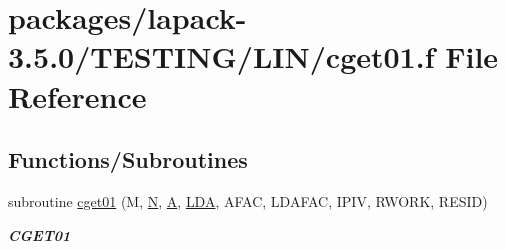 \hypertarget{cget01_8f}{}\section{packages/lapack-\/3.5.0/\+T\+E\+S\+T\+I\+N\+G/\+L\+I\+N/cget01.f File Reference}
\label{cget01_8f}
\subsection*{Functions/\+Subroutines}
\begin{DoxyCompactItemize}
\item 
subroutine \hyperlink{group__complex__lin_ga03ee60a57ec9e14a15595e6556d780cd}{cget01} (M, \hyperlink{polmisc_8c_a0240ac851181b84ac374872dc5434ee4}{N}, \hyperlink{classA}{A}, \hyperlink{example__user_8c_ae946da542ce0db94dced19b2ecefd1aa}{L\+D\+A}, A\+F\+A\+C, L\+D\+A\+F\+A\+C, I\+P\+I\+V, R\+W\+O\+R\+K, R\+E\+S\+I\+D)
\begin{DoxyCompactList}\small\item\em {\bfseries C\+G\+E\+T01} \end{DoxyCompactList}\end{DoxyCompactItemize}
